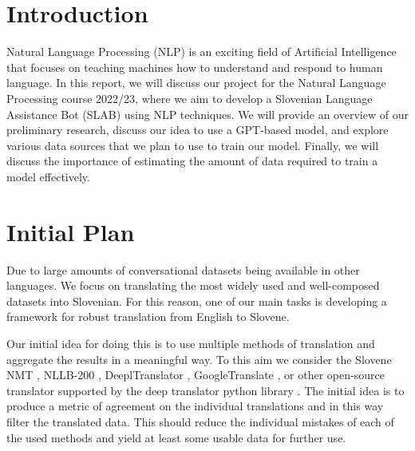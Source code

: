 \documentclass[fleqn,moreauthors,10pt]{ds_report}
\affiliation{\textit{Advisors: doc. dr. Slavko Žitnik}}
\begin{document}
\flushbottom 

\maketitle 

\thispagestyle{empty} 


\section*{Introduction}
	Natural Language Processing (NLP) is an exciting field of Artificial Intelligence that focuses on teaching machines how to understand and respond to human language. 
    In this report, we will discuss our project for the Natural Language Processing course 2022/23, where we aim to develop a Slovenian Language Assistance Bot (SLAB) using NLP techniques.
    We will provide an overview of our preliminary research, discuss our idea to use a GPT-based model, and explore various data sources that we plan to use to train our model.
    Finally, we will discuss the importance of estimating the amount of data required to train a model effectively.

 \section*{Initial Plan}
    Due to large amounts of conversational datasets being available in other languages. We focus on translating the most widely used and well-composed datasets into Slovenian. For this reason, one of our main tasks is developing a framework for robust translation from English to Slovene. 
    
    Our initial idea for doing this is to use multiple methods of translation and aggregate the results in a meaningful way. 
    To this aim we consider the Slovene NMT \cite{11356/1736}, NLLB-200 \cite{nllb2022}, DeeplTranslator \cite{deepl}, GoogleTranslate \cite{google-translate}, or other open-source translator supported by the deep translator python library \cite{deep_transaltor}.
    The initial idea is to produce a metric of agreement on the individual translations and in this way filter the translated data.
    This should reduce the individual mistakes of each of the used methods and yield at least some usable data for further use.
\end{document}
